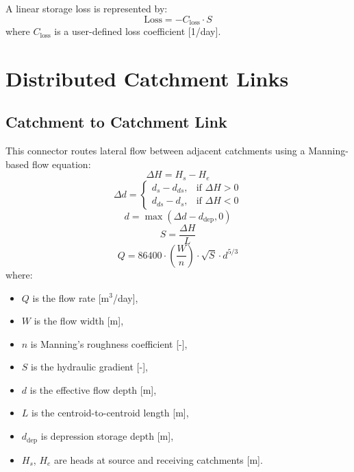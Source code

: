 \documentclass[12pt]{report}
\begin{document}
A linear storage loss is represented by:
\begin{equation}
\text{Loss} = -C_{\text{loss}} \cdot S
\end{equation}
where $C_{\text{loss}}$ is a user-defined loss coefficient [1/day].

\section{Distributed Catchment Links}

\subsection*{Catchment to Catchment Link}

This connector routes lateral flow between adjacent catchments using a Manning-based flow equation:
\begin{equation}
\Delta H = H_s - H_e
\end{equation}
\begin{equation}
\Delta d =
\begin{cases}
  d_s - d_{ds}, & \text{if } \Delta H > 0 \\
  d_{ds} - d_s, & \text{if } \Delta H < 0
\end{cases}
\end{equation}
\begin{equation}
d = \max(\Delta d - d_{\text{dep}}, 0)
\end{equation}
\begin{equation}
S = \frac{\Delta H}{L}
\end{equation}
\begin{equation}
Q = 86400 \cdot \left(\frac{W}{n}\right) \cdot \sqrt{S} \cdot d^{5/3}
\end{equation}
where:
\begin{itemize}
  \item $Q$ is the flow rate [m$^3$/day],
  \item $W$ is the flow width [m],
  \item $n$ is Manning’s roughness coefficient [-],
  \item $S$ is the hydraulic gradient [-],
  \item $d$ is the effective flow depth [m],
  \item $L$ is the centroid-to-centroid length [m],
  \item $d_{\text{dep}}$ is depression storage depth [m],
  \item $H_s$, $H_e$ are heads at source and receiving catchments [m].
\end{itemize}
\end{document}

